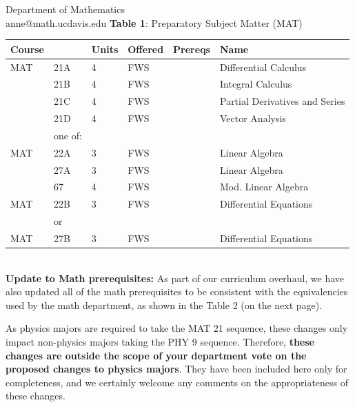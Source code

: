 \documentclass[letterpaper,12pt]{letter}
\begin{document}
\begin{letter}{Department of Mathematics \\ anne@math.ucdavis.edu}
{\bf Table 1}: Preparatory Subject Matter (MAT)\\
\begin{tabular}{|llllll|}
\hline
Course & & Units & Offered & Prereqs & Name \\
\hline
MAT & 21A & 4 & FWS & & Differential Calculus\\ 
    & 21B & 4 & FWS &  & Integral Calculus \\ 
    & 21C & 4 & FWS &  & Partial Derivatives and Series\\ 
    & 21D & 4 & FWS &  & Vector Analysis\\
\hline
    & one of:  & & & & \\
MAT & 22A & 3 & FWS &  & Linear Algebra\\
    & 27A & 3 & FWS &  & Linear Algebra\\
    & 67  & 4 & FWS &  & Mod. Linear Algebra\\
\hline
MAT & 22B & 3 & FWS &  & Differential Equations\\
    & or  & & & & \\
MAT & 27B & 3 & FWS &  & Differential Equations\\ 
\hline
\end{tabular}\\


{\bf Update to Math prerequisites:} As part of our curriculum
overhaul, we have also updated all of the math prerequisites to be
consistent with the equivalencies used by the math department, as
shown in the Table 2 (on the next page).

As physics majors are required to take the MAT 21 sequence, these
changes only impact non-physics majors taking the PHY 9 sequence.
Therefore, {\bf these changes are outside the scope of your department
  vote on the proposed changes to physics majors}.  They have been
included here only for completeness, and we certainly welcome any
comments on the appropriateness of these changes.

\newpage


\end{letter}
\end{document}
